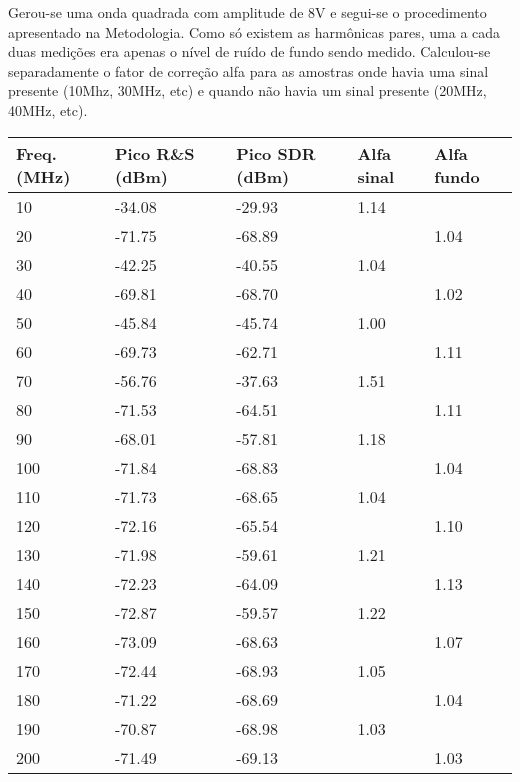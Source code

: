Gerou-se uma onda quadrada com amplitude de 8V e segui-se o procedimento apresentado na Metodologia. Como só existem as harmônicas pares, uma a cada duas medições era apenas o nível de ruído de fundo sendo medido. Calculou-se separadamente o fator de correção alfa para as amostras onde havia uma sinal presente (10Mhz, 30MHz, etc) e quando não havia um sinal presente (20MHz, 40MHz, etc).
\begin{table}[H]
    \centering
    \begin{tabular}{|l|l|l|l|l|}
    \hline
        Freq. (MHz) & Pico R\&S (dBm) & Pico SDR (dBm) & Alfa sinal & Alfa fundo \\ \hline
        10 & -34.08 & -29.93 & 1.14 & ~ \\ \hline
        20 & -71.75 & -68.89 & ~ & 1.04 \\ \hline
        30 & -42.25 & -40.55 & 1.04 & ~ \\ \hline
        40 & -69.81 & -68.70 & ~ & 1.02 \\ \hline
        50 & -45.84 & -45.74 & 1.00 & ~ \\ \hline
        60 & -69.73 & -62.71 & ~ & 1.11 \\ \hline
        70 & -56.76 & -37.63 & 1.51 & ~ \\ \hline
        80 & -71.53 & -64.51 & ~ & 1.11 \\ \hline
        90 & -68.01 & -57.81 & 1.18 & ~ \\ \hline
        100 & -71.84 & -68.83 & ~ & 1.04 \\ \hline
        110 & -71.73 & -68.65 & 1.04 & ~ \\ \hline
        120 & -72.16 & -65.54 & ~ & 1.10 \\ \hline
        130 & -71.98 & -59.61 & 1.21 & ~ \\ \hline
        140 & -72.23 & -64.09 & ~ & 1.13 \\ \hline
        150 & -72.87 & -59.57 & 1.22 & ~ \\ \hline
        160 & -73.09 & -68.63 & ~ & 1.07 \\ \hline
        170 & -72.44 & -68.93 & 1.05 & ~ \\ \hline
        180 & -71.22 & -68.69 & ~ & 1.04 \\ \hline
        190 & -70.87 & -68.98 & 1.03 & ~ \\ \hline
        200 & -71.49 & -69.13 & ~ & 1.03 \\ \hline
    \end{tabular}
\end{table}

